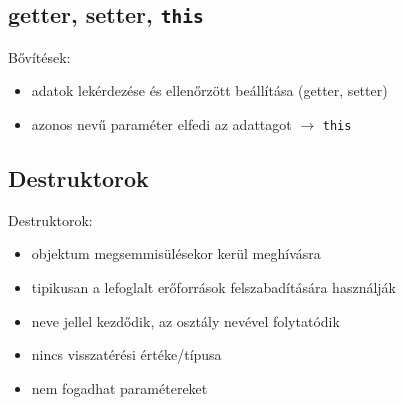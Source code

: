 \documentclass[usenames,dvipsnames,aspectratio=169]{beamer}
\begin{document}
\subsection{getter, setter, \texttt{this}}

\begin{frame}
    Bővítések:
    \begin{itemize}
        \item adatok lekérdezése és ellenőrzött beállítása (getter, setter)
        \item azonos nevű paraméter elfedi az adattagot $\to$ \texttt{this}
    \end{itemize}
    \begin{exampleblock}{}
        \scriptsize
        \vspace{-0.3cm}
        
        
        \vspace{-0.3cm}
    \end{exampleblock}
\end{frame}

\begin{frame}
    \begin{exampleblock}{}
        
    \end{exampleblock}
\end{frame}

\begin{frame}
    \begin{exampleblock}{}
        
    \end{exampleblock}
\end{frame}

\subsection{Destruktorok}

\begin{frame}
    Destruktorok:
    \begin{itemize}
        \item objektum megsemmisülésekor kerül meghívásra
        \item tipikusan a lefoglalt erőforrások felszabadítására használják
        \item neve \kiemel{\textasciitilde} jellel kezdődik, az osztály nevével folytatódik
        \item nincs visszatérési értéke/típusa
        \item nem fogadhat paramétereket
    \end{itemize}
\end{frame}
\end{document}

